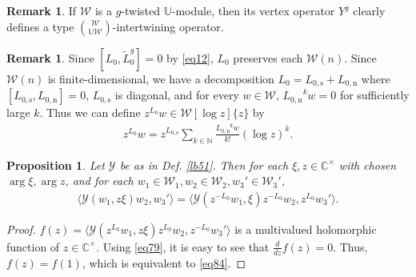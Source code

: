 \documentclass[12pt,a4paper,notitlepage]{article}
\theoremstyle{definition}
\newtheorem{rem}[df]{Remark}
\theoremstyle{plain}
\newtheorem{pp}[df]{Proposition}
\newcommand{\mc}{\mathcal}
\newcommand{\wtd}{\widetilde}
\newcommand{\bk}[1]{\langle {#1}\rangle}
\newcommand{\Ubb}{\mathbb U}
\newcommand{\Cbb}{\mathbb C}
\newcommand{\Nbb}{\mathbb N}
\newcommand{\Lss}{{L_{0,\mathrm{s}}}}
\newcommand{\Lni}{{L_{0,\mathrm{n}}}}
\numberwithin{equation}{subsection}
\begin{document}
\begin{rem}
If $\mc W$ is a $g$-twisted $\Ubb$-module, then its vertex operator $Y^g$ clearly defines a type $\mc W\choose\Ubb\mc W$-intertwining operator.
\end{rem}




\begin{rem}
Since $[L_0,\wtd L_0^g]=0$ by \eqref{eq12}, $L_0$ preserves each $\mc W(n)$. Since $\mc W(n)$ is finite-dimensional, we have a decomposition $L_0=\Lss+\Lni$ where $[\Lss,\Lni]=0$, $\Lss$ is diagonal, and for every $w\in\mc W$, $\Lni^kw=0$ for sufficiently large $k$. Thus we can define $z^{L_0}w\in\mc W[\log z]\{z\}$	by
\begin{align*}
z^{L_0}w=z^\Lss\sum_{k\in\Nbb}\frac{\Lni^k w}{k!}(\log z)^k.
\end{align*}
\end{rem}

\begin{pp}\label{lb56}
Let $\mc Y$ be as in Def. \ref{lb51}. Then for each $\xi,z\in\Cbb^\times$ with chosen $\arg\xi,\arg z$, and for each $w_1\in\mc W_1,w_2\in\mc W_2,w_3'\in\mc W_3'$,
\begin{align}
\bk{\mc Y(w_1,z\xi)w_2,w_3'}=\bk{\mc Y(z^{-L_0}w_1,\xi)z^{-L_0}w_2,z^{L_0}w_3'}.	\label{eq84}
\end{align}
\end{pp}


\begin{proof}
$f(z)=\bk{\mc Y(z^{L_0}w_1,z\xi)z^{L_0}w_2,z^{-L_0}w_3'}$ is a multivalued holomorphic function of $z\in\Cbb^\times$. Using \eqref{eq79}, it is easy to see that $\frac{d}{dz}f(z)=0$. Thus, $f(z)=f(1)$, which is equivalent to \eqref{eq84}.
\end{proof}
\end{document}
